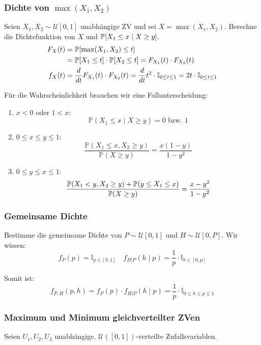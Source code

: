 \subsubsection*{\texorpdfstring{Dichte von \(\max(X_1,X_2)\)}{Dichte von max()}}

Seien \(X_1, X_2 \sim \mathcal{U}[0,1]\) unabhängige ZV und sei \(X = \max (X_1, X_2)\). Berechne die Dichtefunktion von \(X\) und \(\P[X_1 \leq x \mid X \geq y]\).
\begin{align*}
	F_X(t) & = \P[\max(X_1, X_2) \leq t]                                                                                                              \\ &= \P[X_1 \leq t] \cdot \P[X_2 \leq t] = F_{X_1}(t) \cdot F_{X_2}(t) \\
	f_X(t) & = \frac{d}{dt} F_{X_1}(t) \cdot F_{X_2}(t) = \frac{d}{dt} t^2 \cdot \mathbb{I}_{0 \leq t \leq 1} = 2t \cdot \mathbb{I}_{0 \leq t \leq 1}
\end{align*}

Für die Wahrscheinlichkeit brauchen wir eine Fallunterscheidung: \smallskip

\begin{enumerate}
	\item \(x < 0\) oder \(1 < x\):
	      \[\mathbb{P}(X_1 \leq x \mid X \geq y) = 0 \text{ bzw. } 1\]
	\item \(0 \leq x \leq y \leq 1\):
	      \[\frac{\mathbb{P}(X_1 \leq x, X_2 \geq y)}{\mathbb{P}(X \geq y)} = \frac{x(1-y)}{1 - y^2}\]
	\item \(0 \leq y \leq x \leq 1\):
	      \[\frac{\mathbb{P}(X_1 < y, X_2 \geq y) + \P(y \leq X_1 \leq x)}{\mathbb{P}(X \geq y)} = \frac{x - y^2}{1 - y^2}\]
\end{enumerate}

\subsubsection*{Gemeinsame Dichte}

Bestimme die gemeinsame Dichte von \(P \sim \mathcal{U}[0,1]\) und \(H \sim \mathcal{U}[0,P]\). Wir wissen:
\[f_P(p) = \mathbb I_{p \in [0,1]} \quad f_{H | P}(h \mid p) = \frac{1}{p} \cdot \mathbb{I}_{h \in [0,p]}\]

\noindent
Somit ist:
\[f_{P, H} (p, h) = f_P(p) \cdot f_{H | P}(h \mid p) = \frac{1}{p} \cdot \mathbb I_{0 \leq h \leq p \leq 1}\]

\subsubsection*{Maximum und Minimum gleichverteilter ZVen}
Seien $U_1, U_2, U_3$ unabhängige, $\mathcal{U}([0,1])$-verteilte Zufallsvariablen. 

